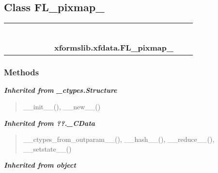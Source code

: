 \subsection{Class FL\_pixmap\_}

    \label{xformslib:xfdata:FL_pixmap_}
\begin{tabular}{cccccccccc}
\multicolumn{2}{r}{\settowidth{\BCL}{object}\multirow{2}{\BCL}{object}}
&&
&&
&&
  \\\cline{3-3}
  &&\multicolumn{1}{c|}{}
&&
&&
&&
  \\
\multicolumn{4}{r}{\settowidth{\BCL}{??.\_CData}\multirow{2}{\BCL}{??.\_CData}}
&&
&&
  \\\cline{5-5}
  &&&&\multicolumn{1}{c|}{}
&&
&&
  \\
\multicolumn{6}{r}{\settowidth{\BCL}{\_ctypes.Structure}\multirow{2}{\BCL}{\_ctypes.Structure}}
&&
  \\\cline{7-7}
  &&&&&&\multicolumn{1}{c|}{}
&&
  \\
&&&&&&\multicolumn{2}{l}{\textbf{xformslib.xfdata.FL\_pixmap\_}}
\end{tabular}



  \subsubsection{Methods}


\large{\textbf{\textit{Inherited from \_ctypes.Structure}}}

\begin{quote}
\_\_init\_\_(), \_\_new\_\_()
\end{quote}

\large{\textbf{\textit{Inherited from ??.\_CData}}}

\begin{quote}
\_\_ctypes\_from\_outparam\_\_(), \_\_hash\_\_(), \_\_reduce\_\_(), \_\_setstate\_\_()
\end{quote}

\large{\textbf{\textit{Inherited from object}}}

